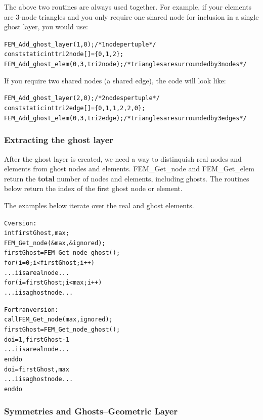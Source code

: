 \documentclass[10pt]{article}
\begin{document}
The above two routines are always used together. For example, if your elements are 3-node triangles and you only require one shared node for inclusion in a single ghost layer, you would use:
\begin{alltt}
   FEM\_Add\_ghost\_layer(1,0); /* 1 node per tuple */
   const static int tri2node[]=\{0,1,2\};
   FEM\_Add\_ghost\_elem(0,3,tri2node); /* triangles are surrounded by 3 nodes */
\end{alltt}

If you require two shared nodes (a shared edge), the code will look like:
\begin{alltt}    
   FEM\_Add\_ghost\_layer(2,0); /* 2 nodes per tuple */
   const static int tri2edge[]=\{0,1,  1,2,  2,0\};
   FEM\_Add\_ghost\_elem(0,3,tri2edge); /*triangles are surrounded by 3 edges */
\end{alltt}



\subsubsection{Extracting the ghost layer}
After the ghost layer is created, we need a way to distinquish real nodes and elements 
from ghost nodes and elements. FEM\_Get\_node and FEM\_Get\_elem return the 
\textbf{total} number of nodes and elements, including ghosts. The routines below 
return the index of the first ghost node or element.

The examples below iterate over the real and ghost elements.
\begin{alltt}
C version:
        int firstGhost,max;
        FEM\_Get\_node(\&max, \&ignored);
        firstGhost=FEM\_Get\_node\_ghost();
        for (i=0;i<firstGhost;i++)
                ... i is a real node...
        for (i=firstGhost;i<max;i++)
                ... i is a ghost node ...

Fortran version:
        call FEM\_Get\_node(max,ignored);
        firstGhost=FEM\_Get\_node\_ghost();
        do i=1,firstGhost-1
                ... i is a real node...
        end do
        do i=firstGhost,max
                ... i is a ghost node...
        end do
\end{alltt}

\subsubsection{Symmetries and Ghosts--Geometric Layer}
\end{document}
